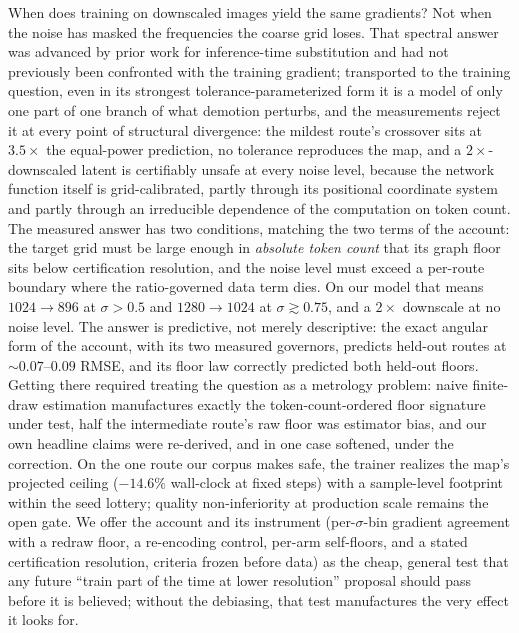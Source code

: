 When does training on downscaled images yield the same gradients? Not
when the noise has masked the frequencies the coarse grid loses. That
spectral answer was advanced by prior work for inference-time
substitution and had not previously been confronted with the training
gradient; transported to the training question, even in its strongest
tolerance-parameterized form it is a model of only one part of one
branch of what demotion perturbs, and the measurements reject it at
every point of structural divergence: the
mildest route's crossover sits at $3.5\times$ the equal-power
prediction, no tolerance reproduces the map, and a $2\times$-downscaled
latent is certifiably unsafe at every noise level, because the network
function itself is grid-calibrated, partly through its positional
coordinate system and partly through an irreducible dependence of the
computation on token count. The measured answer has two conditions,
matching the two terms of the account: the target grid must be large
enough in \emph{absolute token count} that its graph floor sits below
certification resolution, and the noise level must exceed a per-route
boundary where the ratio-governed data term dies. On our model that
means $1024{\to}896$ at $\sigma > 0.5$ and $1280{\to}1024$ at
$\sigma \gtrsim 0.75$, and a $2\times$ downscale at no noise
level. The answer is predictive, not merely descriptive: the exact
angular form of the account, with its two measured governors, predicts
held-out routes at ${\sim}0.07$--$0.09$ RMSE, and its floor law
correctly predicted both held-out floors. Getting there required
treating the question as a
metrology problem: naive finite-draw estimation manufactures exactly
the token-count-ordered floor signature under test, half the
intermediate route's raw floor was estimator bias, and our own headline
claims were re-derived, and in one case softened, under the correction.
On the one route our corpus makes safe, the trainer realizes the map's
projected ceiling ($-14.6\%$ wall-clock at fixed steps) with a
sample-level footprint within the seed lottery; quality non-inferiority
at production scale remains the open gate. We
offer the account and its instrument (per-$\sigma$-bin gradient
agreement with a redraw floor, a re-encoding control, per-arm
self-floors, and a stated certification resolution, criteria frozen
before data) as the cheap, general test that any future ``train part
of the time at lower resolution'' proposal should pass before it is
believed; without the debiasing, that test manufactures the very effect
it looks for.

